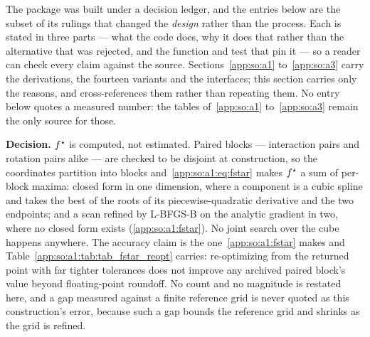 \label{app:so:a4}

The package was built under a decision ledger, and the entries below are the
subset of its rulings that changed the \emph{design} rather than the process.
Each is stated in three parts --- what the code does, why it does that rather
than the alternative that was rejected, and the function and test that pin it
--- so a reader can check every claim against the source.
Sections~\ref{app:so:a1} to~\ref{app:so:a3} carry the derivations, the
fourteen variants and the interfaces; this section carries only the reasons,
and cross-references them rather than repeating them. No entry below quotes a
measured number: the tables of~\ref{app:so:a1} to~\ref{app:so:a3} remain the
only source for those.

\label{app:so:a4:d1}

\textbf{Decision.} $f^\star$ is computed, not estimated. Paired blocks ---
interaction pairs and rotation pairs alike --- are checked to be disjoint at
construction, so the coordinates partition into blocks
and~\eqref{app:so:a1:eq:fstar} makes $f^\star$
a sum of per-block maxima: closed form in one dimension, where a component is a
cubic spline and  takes the best of the roots of its
piecewise-quadratic derivative and the two endpoints; and a scan refined by
L-BFGS-B on the analytic gradient in two, where no closed form exists
(\ref{app:so:a1:fstar}). No joint search over the cube happens anywhere. The
accuracy claim is the one~\ref{app:so:a1:fstar} makes and
Table~\ref{app:so:a1:tab:tab_fstar_reopt} carries: re-optimizing from the
returned point with far tighter tolerances does not improve any archived paired
block's value beyond floating-point roundoff. No count and no magnitude is
restated here, and a gap measured against a finite reference grid is never
quoted as this construction's error, because such a gap bounds the reference
grid and shrinks as the grid is refined.

